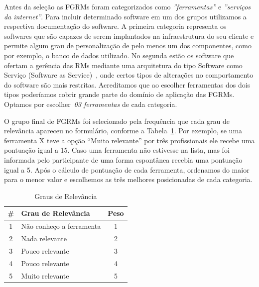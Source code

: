 Antes da seleção as FGRMs foram categorizados como \textit{''ferramentas''} e
\textit{''serviços da internet''}. Para incluir determinado software em um dos
grupos utilizamos a respectiva documentação do software. A primeira categoria
representa os softwares que são capazes de serem implantados na infraestrutura
do seu cliente e permite algum grau de personalização de pelo menos um dos
componentes, como por exemplo, o banco de dados utilizado. No segunda estão os
software que ofertam a gerência das RMs mediante uma arquitetura do tipo
Software como Serviço (Software as Service)~\cite{fox2013engineering}, onde
certos tipos de alterações no comportamento do software são mais restritas.
Acreditamos que ao escolher ferramentas dos dois tipos poderíamos cobrir grande
parte do domínio de aplicação das FGRMs. Optamos por escolher~\textit{03
    ferramentas} de cada categoria.


O grupo final de FGRMs foi selecionado pela frequência que cada grau de
relevância apareceu no formulário, conforme a Tabela~\ref{tab:graus_relevancia}.
Por exemplo, se uma ferramenta X teve a opção ``Muito relevante'' por três
profissionais ele recebe uma pontuação igual a 15. Caso uma ferramenta não
estivesse na lista, mas foi informada pelo participante de uma forma espontânea
recebia uma pontuação igual a 5. Após o cálculo de pontuação de cada ferramenta,
ordenamos do maior para o menor valor e escolhemos as três melhores posicionadas
de cada categoria.



\begin{table}[htpb]
\centering
\begin{tabular}{@{}clc@{}}
\toprule
\textbf{\#} & \textbf{Grau de Relevância} & \textbf{Peso} \\ \midrule
1 & Não conheço a ferramenta & 1 \\
2 & Nada relevante & 2 \\
3 & Pouco relevante & 3 \\
4 & Pouco relevante & 4 \\
5 & Muito relevante & 5 \\ \bottomrule
\end{tabular}
\caption{Graus de Relevância}
\label{tab:graus_relevancia}
\end{table}


